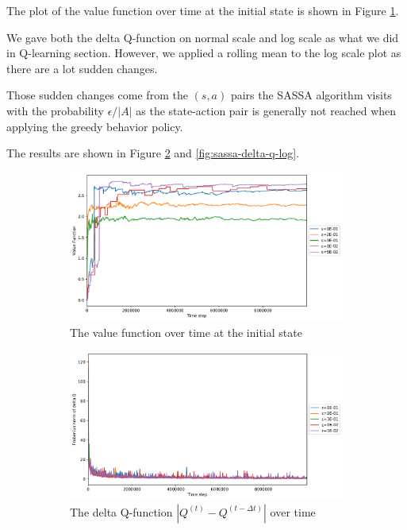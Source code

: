 \documentclass{article}
\begin{document}
The plot of the value function over time at the initial state is shown in Figure
\ref{fig:sassa-v0}.


We gave both the delta Q-function on normal scale and log scale as what we did
in Q-learning section.
However, we applied a rolling mean to the log scale plot as there are a lot
sudden changes.

Those sudden changes come from the $(s, a)$ pairs the SASSA algorithm visits
with the probability $\epsilon / |A|$ as the state-action pair is generally not
reached when applying the greedy behavior policy.

The results are shown in Figure \ref{fig:sassa-delta-q} and \ref{fig:sassa-delta-q-log}.

\begin{figure}
  \centering
  \begin{subfigure}{\textwidth}
    \centering
    \includegraphics[width=.8\linewidth]{sassa_v_fun_0.pdf}
    \caption{The value function over time at the initial state}
    \label{fig:sassa-v0}
  \end{subfigure}
  \begin{subfigure}{\textwidth}
    \centering
    \includegraphics[width=.8\linewidth]{sassa_norm_delta_q.pdf}
    \caption{The delta Q-function $|Q^{(t)} - Q^{(t-\Delta t)}|$ over time}
    \label{fig:sassa-delta-q}
  \end{subfigure}
  \begin{subfigure}{\textwidth}

\end{subfigure}
\end{figure}
\end{document}
